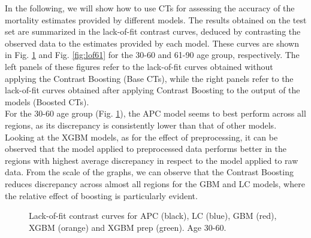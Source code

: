 \documentclass[fleqn,10pt]{wlscirep}
\begin{document}
In the following, we will show how to use CTs for assessing the accuracy of the mortality estimates provided by different models. 
The results obtained on the test set are summarized in the lack-of-fit contrast curves, deduced by contrasting the observed data to the estimates provided by each model.
These curves are shown in Fig. \ref{fig:lof} and Fig. \ref{fig:lof61} for the 30-60 and 61-90 age group, respectively. The left panels of these figures refer to the lack-of-fit curves obtained without applying the Contrast Boosting (Base CTs), while the right panels refer to the lack-of-fit curves obtained after applying Contrast Boosting to the output of the models (Boosted CTs).\\
For the 30-60 age group (Fig. \ref{fig:lof}), the APC model seems to best perform across all regions, as its discrepancy is consistently lower than that of other models. 
Looking at the XGBM models, as for the effect of preprocessing, it can be observed that the model applied to preprocessed data performs better in the regions with highest average discrepancy in respect to the model applied to raw data. 
From the scale of the graphs, we can observe that the Contrast Boosting reduces discrepancy across almost all regions for the GBM and LC models, where the relative effect of boosting is particularly evident. 
%
\begin{figure}[ht]
\centering
{}
\caption{Lack-of-fit contrast curves for APC (black), LC (blue), GBM (red), XGBM (orange) and XGBM prep (green). Age 30-60.}
\label{fig:lof}
\end{figure}
\end{document}
